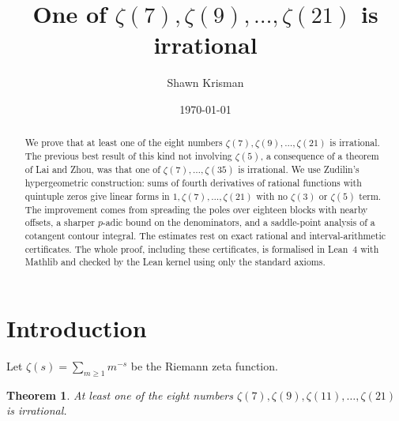 \documentclass[11pt]{amsart}
\newtheorem{theorem}{Theorem}[section]
\theoremstyle{definition}
\theoremstyle{remark}
\numberwithin{equation}{section}
\begin{document}
\title{One of $\zeta(7),\zeta(9),\dots,\zeta(21)$ is irrational}

\author{Shawn Krisman}


\date{\today}

\begin{abstract}
We prove that at least one of the eight numbers $\zeta(7),\allowbreak\zeta(9),\allowbreak\dots,\allowbreak\zeta(21)$
is irrational. The previous best result of this kind not involving $\zeta(5)$, a consequence of a theorem of Lai
and Zhou, was that one of $\zeta(7),\dots,\zeta(35)$ is irrational. We use Zudilin's hypergeometric construction:
sums of fourth derivatives of rational functions with quintuple zeros give linear forms in
$1,\zeta(7),\dots,\zeta(21)$ with no $\zeta(3)$ or $\zeta(5)$ term. The improvement comes from spreading the poles
over eighteen blocks with nearby offsets, a sharper $p$-adic bound on the denominators, and a saddle-point analysis
of a cotangent contour integral. The estimates rest on exact rational and interval-arithmetic certificates. The
whole proof, including these certificates, is formalised in Lean~4 with Mathlib and checked by the Lean kernel using
only the standard axioms.
\end{abstract}

\maketitle

\tableofcontents

\section{Introduction}\label{sec:intro}

Let $\zeta(s)=\sum_{m\ge1}m^{-s}$ be the Riemann zeta function.

\begin{theorem}\label{thm:main}
At least one of the eight numbers $\zeta(7),\allowbreak \zeta(9),\allowbreak \zeta(11),\allowbreak \dots,\allowbreak \zeta(21)$ is irrational.
\end{theorem}
\end{document}
